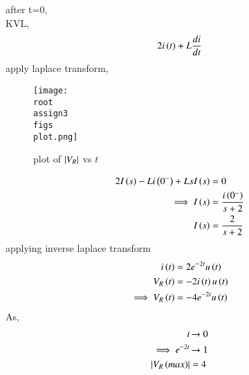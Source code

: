 \documentclass[journal,12pt,twocolumn]{IEEEtran}
\theoremstyle{remark}
\begin{document}
after t=0,\\
KVL, \begin{align}
2i\left(t\right)+L\frac{di}{dt}
\end{align}
apply laplace transform,
\begin{figure}[!ht]
     \centering
     \texttt{[image: \\root\\assign3\\figs\\plot.png]}
     \caption{ plot of $\left\vert V_{R}\right\vert$ vs  $t$}
 \end{figure}
 \begin{align}
2I\left(s\right)-Li\left({0^{-}}\right)+LsI\left(s\right)&=0\\
\implies I\left(s\right)&=\frac{i\left({0^{-}}\right)}{s+2}\\
I\left(s\right)&=\frac{2}{s+2}
 \end{align}
 applying inverse laplace transform
 \begin{align}
  i\left(t\right)&=2e^{-2t} u\left(t\right)\\
  V_R\left(t\right)&=-2i\left(t\right)u\left(t\right)\\
  \implies V_R\left(t\right)&=-4 e^{-2t} u\left(t\right)
 \end{align}  
  As,
 \begin{align}
    t & \xrightarrow{} 0\\
     \implies e^{-2t}&\xrightarrow{} 1\\
     \left\vert V_R\left(max\right)\right\vert&=4
 \end{align}
\end{document}
